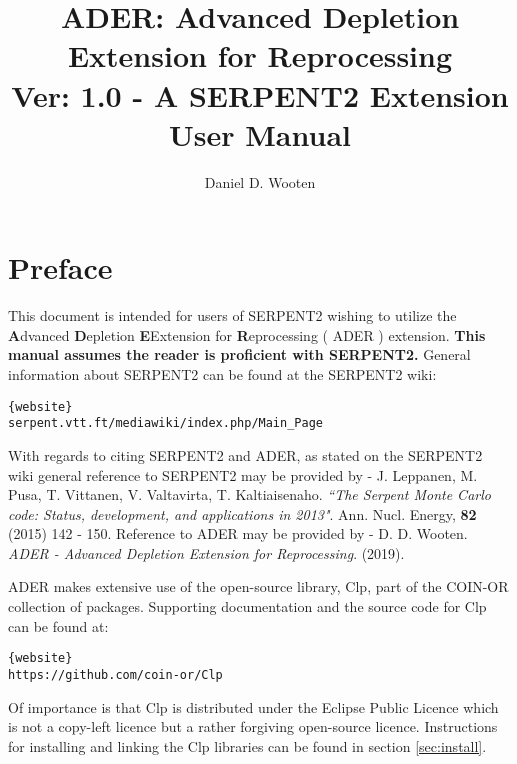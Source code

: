 \documentclass{article}
\numberwithin{equation}{section}
\begin{document}
\title{ADER: Advanced Depletion Extension for Reprocessing\\
\vspace{10pt}\large{Ver: 1.0 - A SERPENT2 Extension}\\
\vspace{10pt}\large{User Manual}}

\author{
    Daniel D. Wooten
}

\clearpage
\maketitle
\pagebreak
\tableofcontents
\pagebreak

\section{Preface}\label{sec:pref}
This document is intended for users of SERPENT2 wishing to utilize the
\textbf{A}dvanced \textbf{D}epletion \textbf{E}Extension for
\textbf{R}eprocessing ( ADER ) extension.
\textbf{This manual assumes the reader is proficient with SERPENT2.}
General information about SERPENT2 can be found at the SERPENT2
wiki: 
\begin{lstlisting}[breaklines, backgroundcolor=\color{white}]{website}
serpent.vtt.ft/mediawiki/index.php/Main_Page
\end{lstlisting}

With regards to citing SERPENT2 and ADER, as stated on the SERPENT2 wiki general
reference to SERPENT2 may be provided by - J. Leppanen, M. Pusa, T. Vittanen,
V. Valtavirta, T. Kaltiaisenaho. \textit{``The Serpent Monte Carlo code: Status,
development, and applications in 2013"}. Ann. Nucl. Energy, \textbf{82} (2015)
142 - 150. Reference to ADER may be provided by - D. D. Wooten. \textit{ADER -
Advanced Depletion Extension for Reprocessing}. (2019).

ADER makes extensive use of the open-source library, Clp, part of the COIN-OR
collection of packages. Supporting documentation and the source code
for Clp can be found at: 
\begin{lstlisting}[breaklines, backgroundcolor=\color{white}]{website}
https://github.com/coin-or/Clp
\end{lstlisting}
Of importance is that Clp is distributed under
the Eclipse Public Licence which is not a copy-left licence but a rather
forgiving open-source licence. Instructions for installing and linking the
Clp libraries can be found in section \ref{sec:install}.
\end{document}
